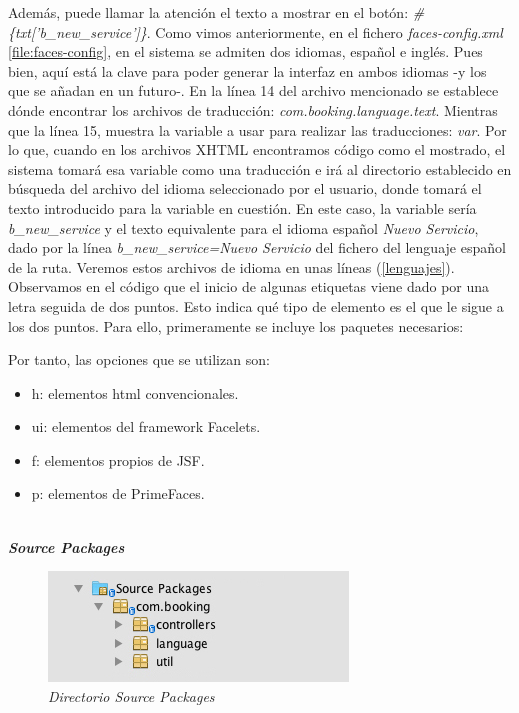 Además, puede llamar la atención el texto a mostrar en el botón: \textit{#\{txt['b\_new\_service']\}}. Como vimos anteriormente, en el fichero \textit{faces-config.xml} \ref{file:faces-config}, en el sistema se admiten dos idiomas, español e inglés. Pues bien, aquí está la clave para poder generar la interfaz en ambos idiomas -y los que se añadan en un futuro-. En la línea 14 del archivo mencionado se establece dónde encontrar los archivos de traducción: \textit{com.booking.language.text}. Mientras que la línea 15, muestra la variable a usar para realizar las traducciones: \textit{var}. Por lo que, cuando en los archivos XHTML encontramos código como el mostrado, el sistema tomará esa variable como una traducción e irá al directorio establecido en búsqueda del archivo del idioma seleccionado por el usuario, donde tomará el texto introducido para la variable en cuestión. En este caso, la variable sería \textit{b\_new\_service} y el texto equivalente para el idioma español \textit{Nuevo Servicio}, dado por la línea \textit{b\_new\_service=Nuevo Servicio} del fichero del lenguaje español de la ruta. Veremos estos archivos de idioma en unas líneas (\ref{lenguajes}).\\

Observamos en el código que el inicio de algunas etiquetas viene dado por una letra seguida de dos puntos. Esto indica qué tipo de elemento es el que le sigue a los dos puntos. Para ello, primeramente se incluye los paquetes necesarios: 



Por tanto, las opciones que se utilizan son: 

\begin{itemize}
\item h: elementos html convencionales.
\item ui: elementos del framework Facelets.
\item f: elementos propios de JSF.
\item p: elementos de PrimeFaces.
\end{itemize}
\\

\textbf{\textit{Source Packages}}
\\

\begin{figure}[H]
\centering
  \includegraphics[scale=.70]{img/ficheros/source-packages.jpg}
  \caption{\textit{Directorio Source Packages}}
  \label{fig:source-packages}
\end{figure}



